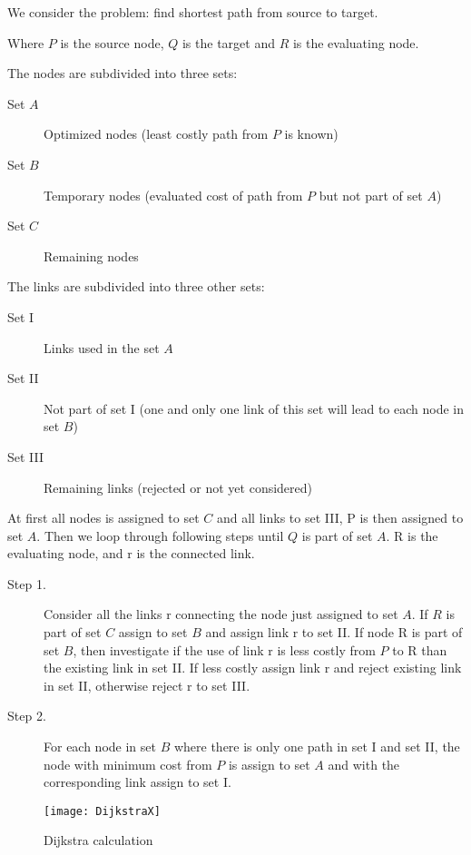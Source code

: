   We consider the problem: find shortest path from source to target.

  Where $P$ is the source node, $Q$ is the target and $R$ is the evaluating node.

  The nodes are subdivided into three sets:

  \begin{description}
    \item[Set $A$]{Optimized nodes (least costly path from $P$ is known)}
    \item[Set $B$]{Temporary nodes (evaluated cost of path from $P$ but not part of set $A$)}
    \item[Set $C$]{Remaining nodes}
  \end{description}

  The links are subdivided into three other sets:

  \begin{description}
    \item[Set \RN{1}]{Links used in the set $A$}
    \item[Set \RN{2}]{Not part of set I (one and only one link of this set will lead to each node in set $B$)}
    \item[Set \RN{3}]{Remaining links (rejected or not yet considered)}
  \end{description}

  At first all nodes is assigned to set $C$ and all links to set \RN{3}, P is then assigned to set $A$.
  Then we loop through following steps until $Q$ is part of set $A$. R is the evaluating node, and r is the connected link.

  \begin{description}
    \item[Step 1.]{Consider all the links r connecting the node just assigned to set $A$. If $R$ is part of set $C$ assign to set $B$ and assign link r to set \RN{2}. If node R is part of set $B$, then investigate if the use of link r is less costly from $P$ to R than the existing link in set \RN{2}. If less costly assign link r and reject existing link in set \RN{2}, otherwise reject r to set \RN{3}.}
    \item[Step 2.]{For each node in set $B$ where there is only one path in set \RN{1} and set \RN{2}, the node with minimum cost from $P$ is assign to set $A$ and with the corresponding link assign to set \RN{1}.}
  \end{description}

  \begin{figure}[ht!]
    \centering
    \texttt{[image: DijkstraX]}
    \caption{Dijkstra calculation}
    \label{overflow}
  \end{figure}

